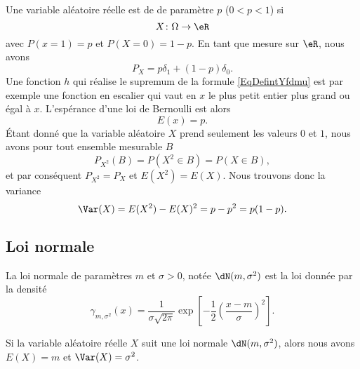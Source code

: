Une variable aléatoire réelle est de  de paramètre \( p\) (\( 0<p<1\)) si
\begin{equation}
    X\colon \Omega\to \eR
\end{equation}
avec \( P(x=1)=p\) et \( P(X=0)=1-p\). En tant que mesure sur \( \eR\), nous avons
\begin{equation}
    P_X=p\delta_1+(1-p)\delta_0.
\end{equation}
Une fonction \( h\) qui réalise le supremum de la formule \eqref{EqDefintYfdmu} est par exemple une fonction en escalier qui vaut en \( x\) le plus petit entier plus grand ou égal à \( x\). L'espérance d'une loi de Bernoulli est alors
\begin{equation}
    E(x)=p.
\end{equation}
Étant donné que la variable aléatoire \( X\) prend seulement les valeurs \( 0\) et \( 1\), nous avons pour tout ensemble mesurable \( B\)
\begin{equation}
    P_{X^2}(B)=P(X^2\in B)=P(X\in B),
\end{equation}
et par conséquent \( P_{X^2}=P_X\) et \( E(X^2)=E(X)\). Nous trouvons donc la variance
\begin{equation}
    \Var(X)=E(X^2)-E(X)^2=p-p^2=p(1-p).
\end{equation}

\subsection{Loi normale}

La loi normale de paramètres \( m\) et \( \sigma>0\), notée \( \dN(m,\sigma^2)\) est la loi donnée par la densité
\begin{equation}
    \gamma_{m,\sigma^2}(x)=\frac{1}{ \sigma\sqrt{2\pi} }\exp\left[ -\frac{ 1 }{2}\left( \frac{ x-m }{ \sigma } \right)^2 \right].
\end{equation}

\begin{proposition}
    Si la variable aléatoire réelle \( X\) suit une loi normale \( \dN(m,\sigma^2)\), alors nous avons \( E(X)=m\) et \( \Var(X)=\sigma^2\).
\end{proposition}


